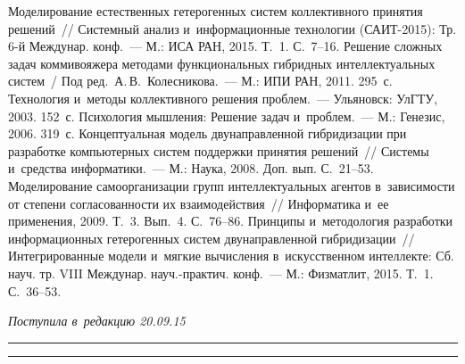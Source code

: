 \begin{multicols}{2}
{{\begin{thebibliography}{99}
 Моделирование естественных гетерогенных систем 
коллективного принятия решений~// Системный анализ и~информационные 
технологии (САИТ-2015): Тр. 6-й Междунар. конф.~---  М.: ИСА РАН, 2015. Т.~1. 
С.~7--16.
 Решение 
сложных задач коммивояжера методами функциональных гибридных интеллектуальных 
систем~/ Под ред.\ А.\,В.~Колесникова.~--- М.: ИПИ РАН, 2011. 295~с.
 Технология и~методы коллективного решения 
проблем.~--- Ульяновск: \mbox{УлГТУ}, 2003. 152~с.
 Психология мышления: Решение задач и~проблем.~--- М.: Генезис, 2006. 319~с.
 Концептуальная модель двунаправленной 
гибридизации при разработке компьютерных систем поддержки принятия решений~// 
Системы и~средства информатики.~--- М.: Наука, 2008. Доп. вып. С.~21--53.
 Моделирование самоорганизации 
групп интеллектуальных агентов в~зависимости от степени согла\-со\-ван\-ности их 
взаимодействия~// Информатика и~ее \mbox{применения}, 2009. Т.~3. Вып.~4. С.~76--86.
 Принципы и~методология разработки информационных гетерогенных 
систем дву\-на\-прав\-лен\-ной гибридизации~// Интегрированные\linebreak
 модели и~мягкие вычисления 
в~искусственном интеллекте: Сб. науч. тр. VIII Междунар. науч.-практич. конф.~--- М.: 
Физматлит, 2015. Т.~1. С.~36--53.

\end{thebibliography}

 }
 }

\end{multicols}

\vspace*{-3pt}

\hfill{\small\textit{Поступила в~редакцию 20.09.15}}

\vspace*{8pt}



\hrule

\vspace*{2pt}

\hrule

\vspace*{8pt}



